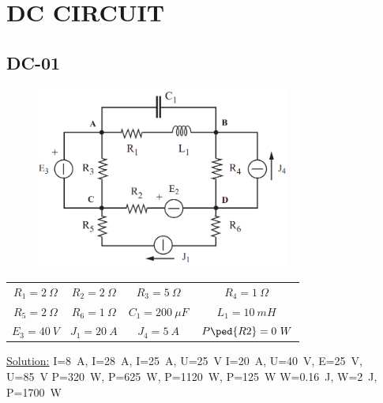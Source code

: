 \section{DC CIRCUIT}
\subsection{DC-01}
\begin{figure}[h]
\includegraphics[height=6cm]{img/1/01.png}
\centering
\end{figure}
\begin{center}
\begin{tabular}{ c c c c }
  $R_1 = 2\ \Omega $ & $R_2 = 2\ \Omega$ & $R_3 = 5\ \Omega$ & $R_4 = 1\ \Omega $\\
  $R_5 = 2\ \Omega $ & $R_6 = 1\ \Omega $& $C_1 = 200\ \mu F $& $L_1 = 10\ mH $\\
  $E_3 = 40\ V$ & $J_1 = 20\ A$ & $J_4 = 5\ A$ & $P\ped{R2}=0\ W$\\
\end{tabular}
\end{center}
\underline{\large{Solution:}}
\newline
I=8\ A, I=28\ A, I=25\ A, U=25\ V
\newline
I=20\ A, U=40\ V, E=25\ V, U=85\ V
\newline
P=320\ W, P=625\ W, P=1120\ W, P=125\ W
\newline
W=0.16\ J, W=2\ J, P=1700\ W 
